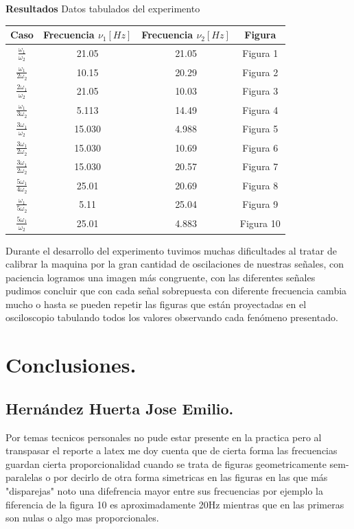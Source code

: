 \documentclass[10pt]{article}
\begin{document}
\begin{multicols}{2}
\textbf{Resultados}
Datos tabulados del experimento 

\begin{center}
	\begin{adjustbox}{width=270pt}
		\begin{tabular}{|c|c|c|c|}
			\hline
			Caso  &Frecuencia $\nu_1 [Hz]$ & Frecuencia $\nu_2 [Hz]$ &Figura \\
			\hline
			$\frac{\omega_1}{\omega_2}$ &21.05 &21.05 & Figura 1 \\
			\hline
			$\frac{\omega_1}{2\omega_2}$ & 10.15&20.29 & Figura 2 \\
			\hline
			$\frac{2\omega_1}{\omega_2}$ &21.05 &10.03 & Figura 3 \\
			\hline
			$\frac{\omega_1}{3\omega_2}$ &5.113 &14.49 & Figura 4\\
			\hline
			$\frac{3\omega_1}{\omega_2}$ &15.030 & 4.988& Figura 5 \\
			\hline
            $\frac{3\omega_1}{2\omega_2}$ &15.030 &10.69 & Figura 6 \\
			\hline
            $\frac{3\omega_1}{2\omega_2}$ & 15.030& 20.57& Figura 7 \\
			\hline
            $\frac{5\omega_1}{4\omega_2}$ & 25.01& 20.69& Figura 8 \\
			\hline
            $\frac{\omega_1}{5\omega_2}$ & 5.11& 25.04& Figura 9 \\
			\hline
            $\frac{5\omega_1}{\omega_2}$ &25.01 &4.883 & Figura 10 \\
			\hline
		\end{tabular}
	\end{adjustbox}
\end{center}

Durante el desarrollo del experimento tuvimos muchas dificultades al tratar de calibrar la maquina por la gran cantidad de oscilaciones de nuestras señales,  con paciencia logramos una imagen más congruente, con las diferentes señales pudimos concluir que con cada señal sobrepuesta con diferente frecuencia cambia mucho o hasta se pueden repetir las figuras que están proyectadas en el osciloscopio tabulando todos los valores observando cada fenómeno presentado. 






\section{Conclusiones.}
\subsection{Hernández Huerta Jose Emilio.}
Por temas tecnicos personales no pude estar presente en la practica pero al transpasar el reporte a latex me doy cuenta que de cierta forma las frecuencias guardan cierta proporcionalidad cuando se trata de figuras geometricamente sem-paralelas o por decirlo de otra forma simetricas en las figuras en las que más "disparejas" noto una difefrencia mayor entre sus frecuencias por ejemplo la fiferencia de la figura 10 es aproximadamente 20Hz mientras que en las primeras son nulas o algo mas proporcionales.

\end{multicols}
\end{document}
